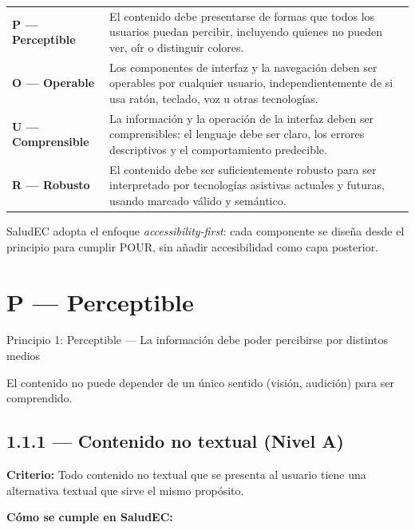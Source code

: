 \documentclass[12pt, a4paper]{article}
\begin{document}
\begin{center}
\begin{tabular}{@{}>{\bfseries\color{navydeep}}p{2.8cm} p{11cm}@{}}
\textbf{P} --- Perceptible & El contenido debe presentarse de formas que todos los usuarios puedan percibir, incluyendo quienes no pueden ver, oír o distinguir colores. \\[6pt]
\textbf{O} --- Operable & Los componentes de interfaz y la navegación deben ser operables por cualquier usuario, independientemente de si usa ratón, teclado, voz u otras tecnologías. \\[6pt]
\textbf{U} --- Comprensible & La información y la operación de la interfaz deben ser comprensibles: el lenguaje debe ser claro, los errores descriptivos y el comportamiento predecible. \\[6pt]
\textbf{R} --- Robusto & El contenido debe ser suficientemente robusto para ser interpretado por tecnologías asistivas actuales y futuras, usando marcado válido y semántico. \\
\end{tabular}
\end{center}

SaludEC adopta el enfoque \textit{accessibility-first}: cada componente se diseña desde el principio para cumplir POUR, sin añadir accesibilidad como capa posterior.

\section{P --- Perceptible}

\begin{princbox}[royalblue]{Principio 1: Perceptible --- La información debe poder percibirse por distintos medios}

El contenido no puede depender de un único sentido (visión, audición) para ser comprendido.
\end{princbox}

\subsection{1.1.1 --- Contenido no textual (Nivel A)}

\textbf{Criterio:} Todo contenido no textual que se presenta al usuario tiene una alternativa textual que sirve el mismo propósito.

\textbf{Cómo se cumple en SaludEC:}
\end{document}

